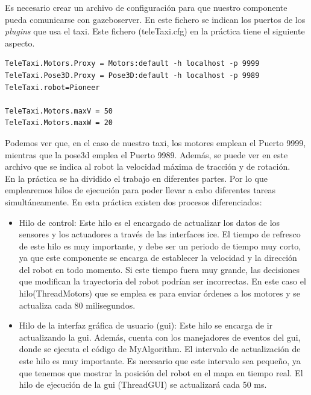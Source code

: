 Es necesario crear un archivo de configuración para que nuestro componente pueda comunicarse con gazeboserver. En este fichero se indican los puertos de los \textit{plugins} que usa el taxi. Este fichero (teleTaxi.cfg) en la práctica tiene el siguiente aspecto.

\vspace{20pt}
	\begin{lstlisting}[frame=single]
TeleTaxi.Motors.Proxy = Motors:default -h localhost -p 9999
TeleTaxi.Pose3D.Proxy = Pose3D:default -h localhost -p 9989
TeleTaxi.robot=Pioneer

TeleTaxi.Motors.maxV = 50
TeleTaxi.Motors.maxW = 20

	\end{lstlisting}

Podemos ver que, en el caso de nuestro taxi, los motores emplean el Puerto 9999, mientras que la pose3d emplea el Puerto 9989. Además, se puede ver en este archivo que se indica al robot la velocidad máxima de tracción y de rotación.\\


En la práctica se ha dividido el trabajo en diferentes partes. Por lo que emplearemos hilos de ejecución para poder llevar a cabo diferentes tareas simultáneamente. En esta práctica existen dos procesos diferenciados:

\begin{itemize}
\item Hilo de control: Este hilo es el encargado de actualizar los datos de los sensores y los actuadores a través de las interfaces \acrshort{ice}. El tiempo de refresco de este hilo es muy importante, y debe ser un periodo de tiempo muy corto, ya que este componente se encarga de establecer la velocidad y la dirección del robot en todo momento. Si este tiempo fuera muy grande, las decisiones que modifican la trayectoria del robot podrían ser incorrectas. En este caso el hilo(ThreadMotors) que se emplea es para enviar órdenes a los motores y se actualiza cada 80 milisegundos.

\item	Hilo de la interfaz gráfica de usuario (\acrshort{gui}): Este hilo se encarga de ir actualizando la \acrshort{gui}. Además, cuenta con los manejadores de eventos del \acrshort{gui}, donde se ejecuta el código de MyAlgorithm. El intervalo de actualización de este hilo es muy importante. Es necesario que este intervalo sea pequeño, ya que tenemos que mostrar la posición del robot en el mapa en tiempo real. El hilo de ejecución de la \acrshort{gui} (ThreadGUI) se actualizará cada 50 ms.

\end{itemize}

